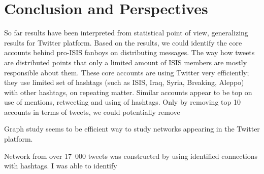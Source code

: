 \documentclass[conference]{IEEEtran}
\begin{document}
    \section{Conclusion and Perspectives}\label{sec:conclusion-and-perspectives}

    So far results have been interpreted from statistical point of view, generalizing results for Twitter platform.
    Based on the results, we could identify the core accounts behind pro-ISIS fanboys on distributing messages.
    The way how tweets are distributed points that only a limited amount of ISIS members are mostly responsible about them.
    These core accounts are using Twitter very efficiently; they use limited set of hashtags (such as ISIS, Iraq, Syria, Breaking, Aleppo) with other hashtags, on repeating matter.
    Similar accounts appear to be top on use of mentions, retweeting and using of hashtags.
    Only by removing top 10 accounts in terms of tweets, we could potentially remove

    Graph study seems to be efficient way to study networks appearing in the Twitter platform.

    Network from over 17~000 tweets was constructed by using identified connections with hashtags.
    I was able to identify

\end{document}
